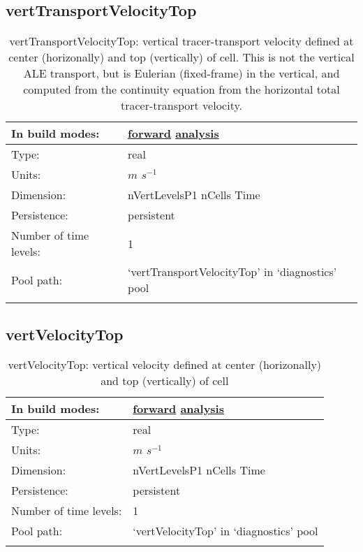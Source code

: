 \subsection[vertTransportVelocityTop]{vertTransportVelocityTop}
\label{subsec:var_sec_diagnostics_vertTransportVelocityTop}
\begin{center}
\begin{longtable}{| p{2.0in} | p{4.0in} |}
        \hline 
        In build modes: & \hyperref[subsec:forward_var_tab_diagnostics]{forward} \hyperref[subsec:analysis_var_tab_diagnostics]{analysis} \\
        \hline 
        Type: & real \\
        \hline 
        Units: & $m$ $s^{-1}$ \\
        \hline 
        Dimension: & nVertLevelsP1 nCells Time \\
        \hline 
        Persistence: & persistent \\
        \hline 
        Number of time levels: & 1 \\
        \hline 
            Pool path: & `vertTransportVelocityTop' in `diagnostics' pool \\
		 \hline 
    \caption{vertTransportVelocityTop: vertical tracer-transport velocity defined at center (horizonally) and top (vertically) of cell.  This is not the vertical ALE transport, but is Eulerian (fixed-frame) in the vertical, and computed from the continuity equation from the horizontal total tracer-transport velocity.}
\end{longtable}
\end{center}
\subsection[vertVelocityTop]{vertVelocityTop}
\label{subsec:var_sec_diagnostics_vertVelocityTop}
\begin{center}
\begin{longtable}{| p{2.0in} | p{4.0in} |}
        \hline 
        In build modes: & \hyperref[subsec:forward_var_tab_diagnostics]{forward} \hyperref[subsec:analysis_var_tab_diagnostics]{analysis} \\
        \hline 
        Type: & real \\
        \hline 
        Units: & $m$ $s^{-1}$ \\
        \hline 
        Dimension: & nVertLevelsP1 nCells Time \\
        \hline 
        Persistence: & persistent \\
        \hline 
        Number of time levels: & 1 \\
        \hline 
            Pool path: & `vertVelocityTop' in `diagnostics' pool \\
		 \hline 
    \caption{vertVelocityTop: vertical velocity defined at center (horizonally) and top (vertically) of cell}
\end{longtable}
\end{center}
